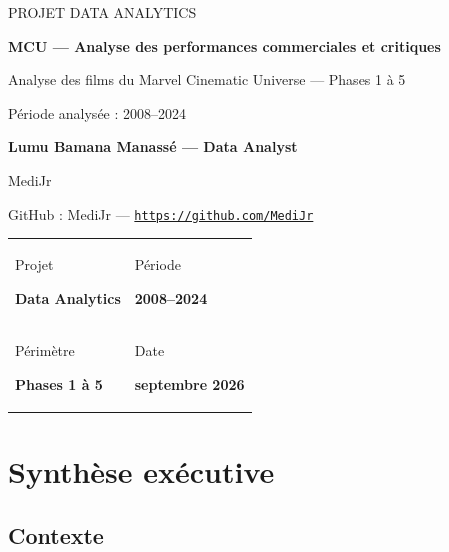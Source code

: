 \documentclass[a4paper,11pt]{article}
\newcommand{\reportmeta}[2]{\textcolor{reportgray}{\scriptsize #1}\par\textbf{#2}\par}
\begin{document}
\begin{titlepage}
  \vspace*{18mm}
  {\color{white}\sffamily\Large PROJET DATA ANALYTICS}\par
  \vspace{25mm}
  {\color{reportblue}\sffamily\fontsize{27}{32}\selectfont\bfseries
    MCU --- Analyse des performances commerciales et critiques\par}
  \vspace{5mm}
  {\large Analyse des films du Marvel Cinematic Universe --- Phases 1 à 5\par}
  \vspace{8mm}
  {\large Période analysée : 2008--2024\par}
  \vspace{12mm}
  {\sffamily\large\bfseries\color{reportblue} Lumu Bamana Manassé --- Data Analyst\par}
  \vspace{2mm}
  {\sffamily\large MediJr\par}
  \vspace{2mm}
  {\sffamily\small\color{reportgray}%
    GitHub : MediJr ---
    \href{https://github.com/MediJr}{\textcolor{reportblue}{\nolinkurl{https://github.com/MediJr}}}\par}
  \vfill
  \begin{tabular}{@{}ll@{}}
    \reportmeta{Projet}{Data Analytics} &
    \reportmeta{Période}{2008--2024}\\[7mm]
    \reportmeta{Périmètre}{Phases 1 à 5} &
    \reportmeta{Date}{septembre 2026}
  \end{tabular}
  \vfill
\end{titlepage}

\tableofcontents
\newpage

\section{Synthèse exécutive}

\subsection{Contexte}
\end{document}

